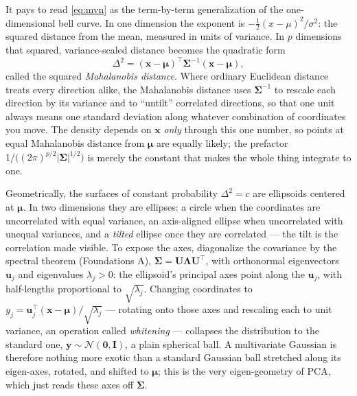 \documentclass[11pt]{article}
\numberwithin{equation}{section}
\theoremstyle{plain}
\theoremstyle{definition}
\theoremstyle{remark}
\newcommand{\Normal}{\mathcal{N}}
\newcommand{\x}{\bm{x}}
\newcommand{\bmu}{\bm{\mu}}
\newcommand{\bSigma}{\bm{\Sigma}}
\newcommand{\T}{\top}
\begin{document}
It pays to read \eqref{eq:mvn} as the term-by-term generalization of the one-dimensional bell curve. In one dimension the exponent is $-\tfrac12 (x - \mu)^2 / \sigma^2$: the squared distance from the mean, measured in units of variance. In $p$ dimensions that squared, variance-scaled distance becomes the quadratic form
\begin{equation}
\Delta^2 = (\x - \bmu)^\T \bSigma^{-1} (\x - \bmu),
\end{equation}
called the squared \emph{Mahalanobis distance}. Where ordinary Euclidean distance treats every direction alike, the Mahalanobis distance uses $\bSigma^{-1}$ to rescale each direction by its variance and to ``untilt'' correlated directions, so that one unit always means one standard deviation along whatever combination of coordinates you move. The density depends on $\x$ \emph{only} through this one number, so points at equal Mahalanobis distance from $\bmu$ are equally likely; the prefactor $1/\big((2\pi)^{p/2} |\bSigma|^{1/2}\big)$ is merely the constant that makes the whole thing integrate to one.

Geometrically, the surfaces of constant probability $\Delta^2 = c$ are ellipsoids centered at $\bmu$. In two dimensions they are ellipses: a circle when the coordinates are uncorrelated with equal variance, an axis-aligned ellipse when uncorrelated with unequal variances, and a \emph{tilted} ellipse once they are correlated --- the tilt is the correlation made visible. To expose the axes, diagonalize the covariance by the spectral theorem (Foundations A), $\bSigma = \bm{U}\bm{\Lambda}\bm{U}^\T$, with orthonormal eigenvectors $\bm{u}_j$ and eigenvalues $\lambda_j > 0$: the ellipsoid's principal axes point along the $\bm{u}_j$, with half-lengths proportional to $\sqrt{\lambda_j}$. Changing coordinates to $y_j = \bm{u}_j^\T(\x - \bmu)/\sqrt{\lambda_j}$ --- rotating onto those axes and rescaling each to unit variance, an operation called \emph{whitening} --- collapses the distribution to the standard one, $\bm{y} \sim \Normal(\bm{0}, \bm{I})$, a plain spherical ball. A multivariate Gaussian is therefore nothing more exotic than a standard Gaussian ball stretched along its eigen-axes, rotated, and shifted to $\bmu$; this is the very eigen-geometry of PCA, which just reads these axes off $\bSigma$.
\end{document}
